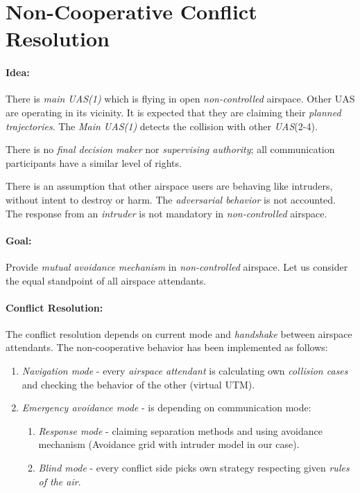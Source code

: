 \newpage
\section{Non-Cooperative Conflict Resolution}\label{sec:nonCooperativeConflictResolution}

\paragraph{Idea:} There is \emph{main UAS(1)} which is flying in open \emph{non-controlled} airspace. Other UAS are operating in its vicinity. It is expected that they are claiming their \emph{planned trajectories}. The \emph{Main UAS(1)} detects the collision with other \emph{UAS}(2-4).

There is no \emph{final decision maker} nor \emph{supervising authority}; all communication participants have a similar level of rights. 
\begin{note}
    There is an assumption that other airspace users are behaving like intruders, without intent to destroy or harm. The \emph{adversarial behavior} is not accounted. The response from an \emph{intruder} is not mandatory in \emph{non-controlled} airspace.
\end{note}

\paragraph{Goal:} Provide \emph{mutual avoidance mechanism} in \emph{non-controlled} airspace. Let us consider the equal standpoint of all airspace attendants.

\paragraph{Conflict Resolution:} The conflict resolution depends on current mode and \emph{handshake} between airspace attendants. The non-cooperative behavior has been implemented as follows:

\begin{enumerate}
    \item\emph{Navigation mode} - every \emph{airspace attendant} is calculating own \emph{collision cases} and checking the behavior of the other (virtual UTM).
    
    \item\emph{Emergency avoidance mode} - is depending on communication mode:
    \begin{enumerate}[a]
        \item\emph{Response mode} - claiming separation methods and using avoidance mechanism (Avoidance grid with intruder model in our case).
        
        \item\emph{Blind mode} - every conflict side picks own strategy respecting given \emph{rules of the air}.
    \end{enumerate}
\end{enumerate}


